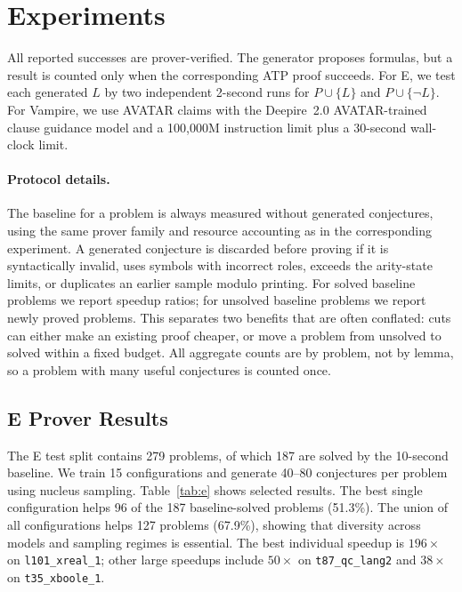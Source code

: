 \documentclass{easychair}
\newcommand{\Eprover}{E\xspace}
\newcommand{\Vampire}{Vampire\xspace}
\begin{document}
\section{Experiments}
\label{sec:experiments}

All reported successes are prover-verified.  The generator proposes
formulas, but a result is counted only when the corresponding ATP proof
succeeds.  For \Eprover, we test each generated $L$ by two independent
2-second runs for $P\cup\{L\}$ and $P\cup\{\neg L\}$.  For \Vampire,
we use AVATAR claims with the Deepire~2.0 AVATAR-trained clause
guidance model and a 100,000M instruction limit plus a 30-second
wall-clock limit.

\paragraph{Protocol details.}
The baseline for a problem is always measured without generated
conjectures, using the same prover family and resource accounting as
in the corresponding experiment.  A generated conjecture is discarded
before proving if it is syntactically invalid, uses symbols with
incorrect roles, exceeds the arity-state limits, or duplicates an
earlier sample modulo printing.  For solved baseline problems we report
speedup ratios; for unsolved baseline problems we report newly proved
problems.  This separates two benefits that are often conflated: cuts
can either make an existing proof cheaper, or move a problem from
unsolved to solved within a fixed budget.  All aggregate counts are by
problem, not by lemma, so a problem with many useful conjectures is
counted once.

\subsection{E Prover Results}

The \Eprover test split contains 279 problems, of which 187 are solved
by the 10-second baseline.  We train 15 configurations and generate
40--80 conjectures per problem using nucleus sampling.  Table~\ref{tab:e}
shows selected results.  The best single configuration helps 96 of the
187 baseline-solved problems (51.3\%).  The union of all configurations
helps 127 problems (67.9\%), showing that diversity across models and
sampling regimes is essential.  The best individual speedup is
$196\times$ on \texttt{l101\_xreal\_1}; other large speedups include
$50\times$ on \texttt{t87\_qc\_lang2} and $38\times$ on
\texttt{t35\_xboole\_1}.
\end{document}
